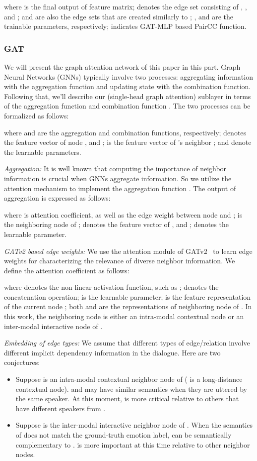 \documentclass[lettersize,journal]{IEEEtran}
\begin{document}
where  is the final output of feature matrix;  denotes the edge set consisting of , , and ;  and  are also the edge sets that are created similarly to ; ,  and  are the trainable parameters, respectively;  indicates GAT-MLP based PairCC function.

\subsubsection{GAT}\label{subsubsec:singlegat}
We will present the graph attention network of this paper in this part. Graph Neural Networks (GNNs) typically involve two processes: aggregating information with the aggregation function and updating state with the combination function. Following that, we'll describe our  (single-head graph attention) sublayer in terms of the aggregation function  and combination function . The two processes can be formalized as follows:

where  and  are the aggregation and combination functions, respectively;  denotes the feature vector of node , and ;  is the feature vector of 's neighbor ;  and  denote the learnable parameters.

\textit{Aggregation:} It is well known that computing the importance of neighbor information is crucial when GNNs aggregate information. So we utilize the attention mechanism to implement the aggregation function . The output of aggregation is expressed as follows:

where  is attention coefficient, as well as the edge weight between node  and ;  is the neighboring node of ;  denotes the feature vector of , and ;  denotes the learnable parameter.

\textit{GATv2 based edge weights:} We use the attention module of GATv2~\cite{brody2022how} to learn edge weights for characterizing the relevance of diverse neighbor information. We define the attention coefficient  as follows:

where  denotes the non-linear activation function, such as ;  denotes the concatenation operation;  is the learnable parameter;  is the feature representation of the current node ; both  and  are the representations of neighboring node of . In this work, the neighboring node is either an intra-modal contextual node or an inter-modal interactive node of .

\textit{Embedding of edge types:} We assume that different types of edge/relation involve different implicit dependency information in the dialogue. Here are two conjectures:
\begin{itemize}
\item[\ding{172}] Suppose  is an intra-modal contextual neighbor node of  ( is a long-distance contextual node).  and  may have similar semantics when they are uttered by the same speaker. At this moment,  is more critical relative to others that have different speakers from . 
\item[\ding{173}] Suppose  is the inter-modal interactive neighbor node of . When the semantics of  does not match the ground-truth emotion label,  can be semantically complementary to .  is more important at this time relative to other neighbor nodes.
\end{itemize}
 
\end{document}
